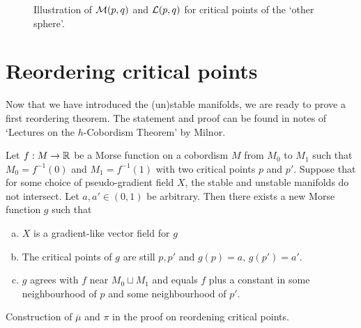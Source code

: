 \begin{figure}[H]
    \centering
    \caption{
        Illustration of $\mathcal M(p, q)$ and $\mathcal L(p, q)$ for critical points of the `other sphere'.
    }
    \label{fig:mathcal-m-trajectories-other-sphere}
\end{figure}





\filbreak
\section{Reordering critical points}
Now that we have introduced the (un)stable manifolds, we are ready to prove a first reordering theorem. The statement and proof can be found in notes of `Lectures on the $h$-Cobordism Theorem' by Milnor.
\begin{theorem}
    Let $f: M \to  \mathbb{R}$ be a Morse function on a cobordism $M$ from $M_0$ to $M_1$ such that $ M_0 = f^{-1}(0)$ and $ M_1 = f^{-1}(1)$ with two critical points $p$ and  $p'$.
    Suppose that for some choice of pseudo-gradient field $X$, the stable and unstable manifolds do not intersect.
    Let $a, a' \in (0,1)$ be arbitrary.
    Then there exists a new Morse function $g$ such that
    \begin{enumerate}[(a)]
        \item $X$ is a gradient-like vector field for  $g$
        \item The critical points of  $g$ are still $p, p'$ and $g(p) = a$,  $g(p') = a'$.
        \item $g$ agrees with  $f$ near $M_0 \sqcup M_1$ and equals $f$ plus a constant in some neighbourhood of  $p$ and some neighbourhood of  $p'$.
    \end{enumerate}
    \label{thm:reordening}
\end{theorem}
\begin{marginfigure}
    \centering
    \caption{
        Construction of $\overline{\mu}$ and $\pi$ in the proof on reordening critical points.
    }
    \label{fig:reordening-theorem-milnor-h-cobordism}
\end{marginfigure}
